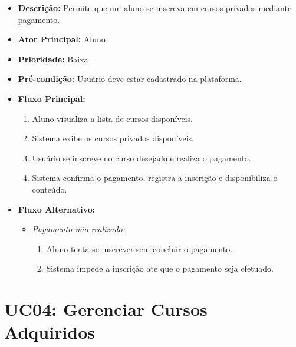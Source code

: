         \begin{itemize}
            \item \textbf{Descrição:} Permite que um aluno se inscreva em cursos privados mediante pagamento.
            
            \item \textbf{Ator Principal:} Aluno
            
            \item \textbf{Prioridade:} Baixa
            
            \item \textbf{Pré-condição:} Usuário deve estar cadastrado na plataforma.
            
            \item \textbf{Fluxo Principal:}
            \begin{enumerate}
                \item Aluno visualiza a lista de cursos disponíveis.
                \item Sistema exibe os cursos privados disponíveis.
                \item Usuário se inscreve no curso desejado e realiza o pagamento.
                \item Sistema confirma o pagamento, registra a inscrição e disponibiliza o conteúdo.
            \end{enumerate}

            \item \textbf{Fluxo Alternativo:}
            \begin{itemize}
                \item \textit{Pagamento não realizado:}
                \begin{enumerate}
                    \item Aluno tenta se inscrever sem concluir o pagamento.
                    \item Sistema impede a inscrição até que o pagamento seja efetuado.
                \end{enumerate}
            \end{itemize}
        \end{itemize}

        \section*{UC04: Gerenciar Cursos Adquiridos}

